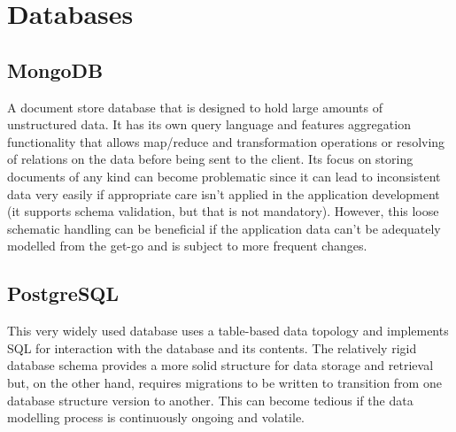 \section{Databases}

\subsection{MongoDB}

A document store database that is designed to hold large amounts of unstructured data. It has its own query language and features aggregation functionality that allows map/reduce and transformation operations or resolving of relations on the data before being sent to the client. Its focus on storing documents of any kind can become problematic since it can lead to inconsistent data very easily if appropriate care isn't applied in the application development (it supports schema validation, but that is not mandatory). However, this loose schematic handling can be beneficial if the application data can't be adequately modelled from the get-go and is subject to more frequent changes.

\subsection{PostgreSQL}

This very widely used database uses a table-based data topology and implements \ac{SQL} for interaction with the database and its contents. The relatively rigid database schema provides a more solid structure for data storage and retrieval but, on the other hand, requires migrations to be written to transition from one database structure version to another. This can become tedious if the data modelling process is continuously ongoing and volatile.
